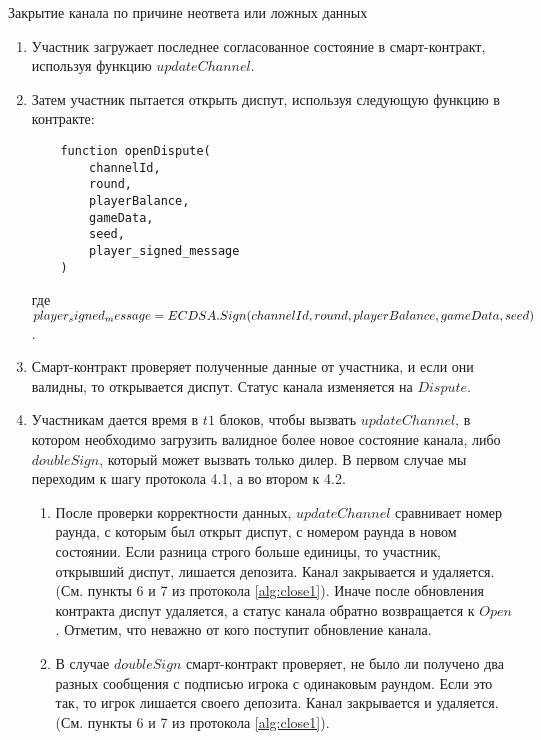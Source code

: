 \begin{algorithm}
\caption{Закрытие канала по причине неответа или ложных данных} \label{alg:close4}
\begin{enumerate}
	\item Участник загружает последнее согласованное состояние в смарт-контракт, используя функцию $updateChannel$.
	\item Затем участник пытается открыть диспут, используя следующую функцию в контракте:
\begin{lstlisting}
    function openDispute(
        channelId,
        round,
        playerBalance,
        gameData,
        seed,
        player_signed_message
    )
\end{lstlisting}
где $ player_signed_message = ECDSA.Sign(channelId, round, \\ playerBalance, gameData, seed)$.
	\item Смарт-контракт проверяет полученные данные от участника, и если они валидны, то открывается диспут. Статус канала изменяется на $Dispute$.
	\item  Участникам дается время в $t1$ блоков, чтобы вызвать $updateChannel$, в котором необходимо загрузить валидное более новое состояние канала, либо $doubleSign$, который может вызвать только дилер. В первом случае мы переходим к шагу протокола 4.1, а во втором к 4.2.
\begin{enumerate}
	\item После проверки корректности данных, $updateChannel$ сравнивает номер раунда, с которым был открыт диспут, с номером раунда в новом состоянии. Если разница строго больше единицы, то участник, открывший диспут, лишается депозита. Канал закрывается и удаляется. (См. пункты 6 и 7 из протокола \autoref{alg:close1}). Иначе после обновления контракта диспут удаляется, а статус канала обратно возвращается к $Open$. Отметим, что неважно от кого поступит обновление канала. \label{upd}
	\item  В случае $doubleSign$ смарт-контракт проверяет, не было ли получено два разных сообщения с подписью игрока с одинаковым раундом. Если это так, то игрок лишается своего депозита.  Канал закрывается и удаляется. (См. пункты 6 и 7 из протокола \autoref{alg:close1}). \label{dbl}
\end{enumerate}
\end{enumerate}
\end{algorithm}
